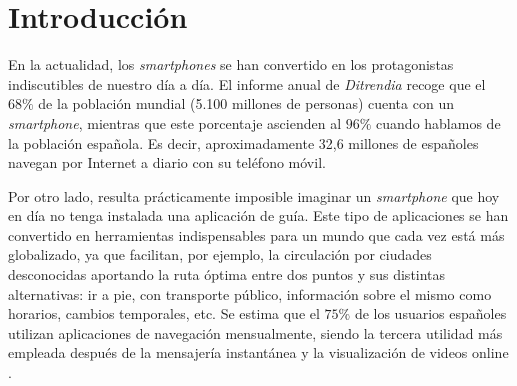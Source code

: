 \chapter{Introducción}
\label{cap:introduccion}


En la actualidad, los \textit{smartphones} se han convertido en los protagonistas indiscutibles de nuestro día a día. El informe anual de \textit{Ditrendia} \citep{ditrendia2019informe} recoge que el $68\%$ de la población mundial (5.100 millones de personas) cuenta con un \textit{smartphone}, mientras que este porcentaje ascienden al $96\%$ cuando hablamos de la población española. Es decir, aproximadamente 32,6 millones de españoles navegan por Internet a diario con su teléfono móvil. 

Por otro lado, resulta prácticamente imposible imaginar un \textit{smartphone} que hoy en día no tenga instalada una aplicación de guía. Este tipo de aplicaciones se han convertido en herramientas indispensables para un mundo que cada vez está más globalizado, ya que facilitan, por ejemplo, la circulación por ciudades desconocidas aportando la ruta óptima entre dos puntos y sus distintas alternativas: ir a pie, con transporte público, información sobre el mismo como horarios, cambios temporales, etc. Se estima que el $75\%$ de los usuarios españoles utilizan aplicaciones de navegación mensualmente, siendo la tercera utilidad más empleada después de la mensajería instantánea y la visualización de videos online \citep{ditrendia2019informe}.

